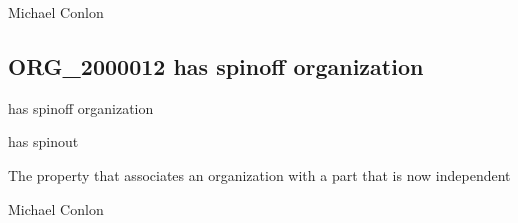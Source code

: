 \documentclass[letterpaper,10pt,english]{sphinxmanual}
\begin{document}
\begin{sphinxShadowBox}

\sphinxAtStartPar
Michael Conlon 
\end{sphinxShadowBox}
\begin{quote}

\ignorespaces \end{quote}


\subsection{ORG\_2000012 \sphinxhyphen{} has spin\sphinxhyphen{}off organization}
\label{\detokenize{doc-ORG_2000012:org-2000012-has-spin-off-organization}}\label{\detokenize{doc-ORG_2000012:index-0}}\label{\detokenize{doc-ORG_2000012::doc}}
\begin{sphinxShadowBox}

\sphinxAtStartPar
has spin\sphinxhyphen{}off organization
\end{sphinxShadowBox}

\begin{sphinxShadowBox}

\sphinxAtStartPar
has spinout
\end{sphinxShadowBox}

\begin{sphinxShadowBox}

\sphinxAtStartPar
{}
\end{sphinxShadowBox}

\begin{sphinxShadowBox}

\sphinxAtStartPar
The property that associates an organization with a part that is now independent
\end{sphinxShadowBox}

\begin{sphinxShadowBox}

\sphinxAtStartPar
Michael Conlon 
\end{sphinxShadowBox}
\end{document}
